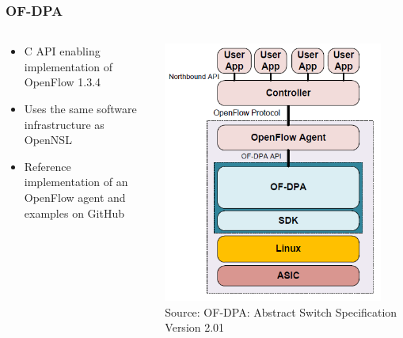 \documentclass[12pt]{beamer}
\begin{document}
\begin{frame}
\frametitle{OF-DPA}
\begin{columns}
\begin{column}{0.5\textwidth}
\begin{itemize}
    \item C API enabling implementation of OpenFlow 1.3.4
    \item Uses the same software infrastructure as OpenNSL
    \item Reference implementation of an OpenFlow agent and examples on GitHub\footnotemark
\end{itemize}
\end{column}
\begin{column}{0.5\textwidth}
\center
\includegraphics[width=0.9\textwidth]{images/of-dpa_components.png}
\scriptsize Source: OF-DPA: Abstract Switch Specification Version 2.01
\end{column}
\end{columns}
\end{frame}
\end{document}
